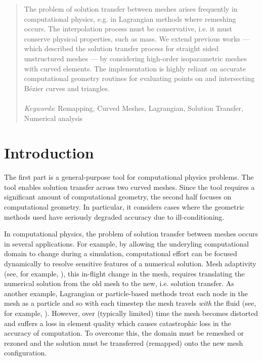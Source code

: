 \documentclass[letterpaper,10pt]{article}
\theoremstyle{definition}
\begin{document}
\begin{abstract}
\noindent The problem of solution transfer between meshes arises frequently in
computational physics, e.g. in Lagrangian methods where remeshing
occurs. The interpolation process must be conservative, i.e. it
must conserve physical properties, such as mass. We extend previous
works --- which described the solution transfer process for straight sided
unstructured meshes --- by considering high-order isoparametric meshes
with curved elements. The implementation is highly reliant on accurate
computational geometry routines for evaluating points on and
intersecting B\'{e}zier curves and triangles.
\\ \\
\noindent \emph{Keywords}: Remapping, Curved Meshes, Lagrangian,
Solution Transfer, Numerical analysis
\end{abstract}

\tableofcontents

\section{Introduction}

The first part is a general-purpose tool for computational physics problems.
The tool enables solution transfer across two curved meshes.
Since the tool requires a significant amount of computational geometry, the
second half focuses on computational geometry. In particular, it considers
cases where the geometric methods used have seriously degraded accuracy due to
ill-conditioning.

In computational physics, the problem of solution transfer between meshes
occurs in several applications. For example, by allowing the underyling
computational domain to change during a simulation, computational
effort can be focused dynamically to resolve sensitive features
of a numerical solution. Mesh adaptivity (see, for example,
\cite{Babuska1978, Peraire1987, Pain2001}), this in-flight change in the mesh,
requires translating the numerical solution from the old mesh to the new,
i.e. solution transfer. As another example, Lagrangian or particle-based
methods treat each node in the mesh as a particle and so with each timestep the
mesh travels \emph{with} the fluid (see, for example, \cite{Hirt1974}).
However, over (typically limited) time the mesh
becomes distorted and suffers a loss in element quality which causes
catastrophic loss in the accuracy of computation. To overcome this, the
domain must be remeshed or rezoned and the solution must be
transferred (remapped) onto the new mesh configuration.
\end{document}
